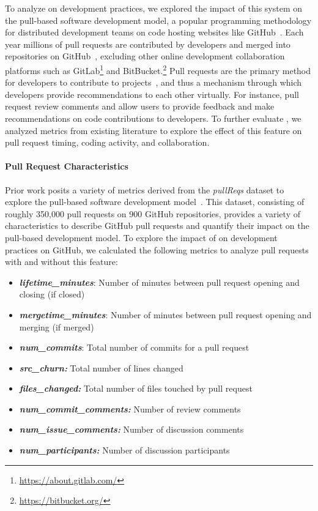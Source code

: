 To analyze \sugg on development practices, we explored the impact of this system on the pull-based software development model, a popular programming methodology for distributed development teams on code hosting websites like GitHub~\cite{gousios2014exploratory}. Each year millions of pull requests are contributed by developers and merged into repositories on GitHub~\cite{Octoverse}, excluding other online development collaboration platforms such as GitLab\footnote{\url{https://about.gitlab.com/}} and BitBucket.\footnote{\url{https://bitbucket.org/}} Pull requests are the primary method for developers to contribute to projects~\cite{gousios2015work}, and thus a mechanism through which developers provide recommendations to each other virtually. For instance, pull request review comments and \sugg allow users to provide feedback and make recommendations on code contributions to developers. To further evaluate \suggs, we analyzed metrics from existing literature to explore the effect of this feature on pull request timing, coding activity, and collaboration.

\paragraph*{Pull Request Characteristics} 

Prior work posits a variety of metrics derived from the \textit{pullReqs} dataset to explore the pull-based software development model~\cite{gousios2014dataset}. This dataset, consisting of roughly 350,000 pull requests on 900 GitHub repositories, provides a variety of characteristics to describe GitHub pull requests and quantify their impact on the pull-based development model. To explore the impact of \suggs on development practices on GitHub, we calculated the following metrics to analyze pull requests with and without this feature: 

\begin{itemize}[topsep=0pt,itemsep=-1ex,partopsep=1ex,parsep=1ex]
    \item \textbf{\em lifetime\_minutes}: Number of minutes between pull request opening and closing (if closed)
    \item \textbf{\em mergetime\_minutes}: Number of minutes between pull request opening and merging (if merged)
    \item \textbf{\em num\_commits}: Total number of commits for a pull request
    \item \textbf{\em src\_churn:} Total number of lines changed
    \item \textbf{\em files\_changed:} Total number of files touched by pull request
    \item \textbf{\em num\_commit\_comments:} Number of review comments
    \item \textbf{\em num\_issue\_comments:} Number of discussion comments
    \item \textbf{\em num\_participants:} Number of discussion participants
\end{itemize}


